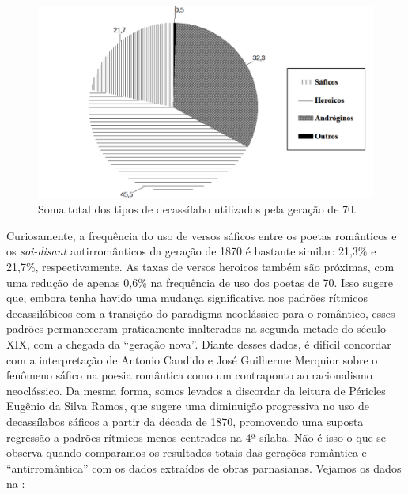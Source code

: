 \documentclass[portuguese]{textolivre}
\begin{document}
\begin{figure}
    \centering
    \begin{minipage}{0.75\linewidth}
    \includegraphics[width=\linewidth]{fig-004.pdf}
    \caption{Soma total dos tipos de decassílabo utilizados pela geração de 70.}
    \label{fig4}
    \end{minipage}
\end{figure}

Curiosamente, a frequência do uso de versos sáficos entre os poetas românticos e os \textit{soi-disant} antirromânticos da geração de 1870 é bastante similar: 21,3\% e 21,7\%, respectivamente. As taxas de versos heroicos também são próximas, com uma redução de apenas 0,6\% na frequência de uso dos poetas de 70. Isso sugere que, embora tenha havido uma mudança significativa nos padrões rítmicos decassilábicos com a transição do paradigma neoclássico para o romântico, esses padrões permaneceram praticamente inalterados na segunda metade do século XIX, com a chegada da “geração nova”. Diante desses dados, é difícil concordar com a interpretação de Antonio Candido e José Guilherme Merquior sobre o fenômeno sáfico na poesia romântica como um contraponto ao racionalismo neoclássico. Da mesma forma, somos levados a discordar da leitura de Péricles Eugênio da Silva Ramos, que sugere uma diminuição progressiva no uso de decassílabos sáficos a partir da década de 1870, promovendo uma suposta regressão a padrões rítmicos menos centrados na 4ª sílaba. Não é isso o que se observa quando comparamos os resultados totais das gerações romântica e “antirromântica” com os dados extraídos de obras parnasianas. Vejamos os dados na :
\end{document}
